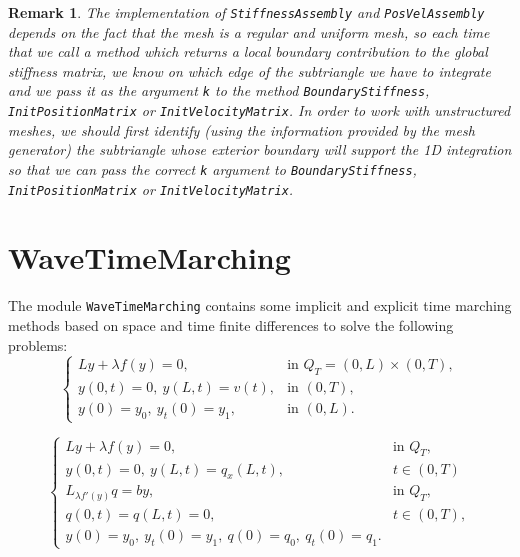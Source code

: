\documentclass{amsart}
\theoremstyle{plain}
\newtheorem{remark}{Remark}
\theoremstyle{definition}
\theoremstyle{remark}
\numberwithin{equation}{section}
\begin{document}
\begin{remark}
The implementation of \verb|StiffnessAssembly| and \verb|PosVelAssembly| depends on the fact that the mesh is a regular and uniform mesh, so each time that we call a method which returns a local boundary contribution to the global stiffness matrix, we know on which edge of the subtriangle we have to integrate and we pass it as the argument \verb|k| to the method \verb|BoundaryStiffness|, \verb|InitPositionMatrix| or \verb|InitVelocityMatrix|. In order to work with unstructured meshes, we should first identify (using the information provided by the mesh generator) the subtriangle whose exterior boundary will support the 1D integration so that we can pass the correct \verb|k| argument to \verb|BoundaryStiffness|, \verb|InitPositionMatrix| or \verb|InitVelocityMatrix|.
\end{remark}

\section{WaveTimeMarching}

The module \verb|WaveTimeMarching| contains some implicit and explicit time marching methods based on space and time finite differences to solve the following problems:
\begin{equation} \label{non_hom_init_boundary_value_problem}
\begin{cases}
L y +\lambda f(y)=0,& \text{in } Q_T=(0,L)\times(0,T),\\
y(0,t)=0,\ y(L,t)=v(t),& \text{in }(0,T),\\
y(0)=y_0,\ y_t(0)=y_1,& \text{in }(0,L).
\end{cases}
\end{equation}

\begin{equation}\label{forward_control_system}
\begin{cases}
L y+\lambda f(y)=0,& \text{in } Q_T,\\
y(0,t)=0,\ y(L,t)=q_x(L,t),& t\in(0,T)\\
L_{\lambda f'(y)} q = by,& \text{in } Q_T,\\
q(0,t)=q(L,t)=0,& t\in(0,T),\\
y(0)=y_0,\ y_t(0)=y_1,\ q(0)=q_0,\ q_t(0)=q_1.
\end{cases}
\end{equation}
\end{document}
